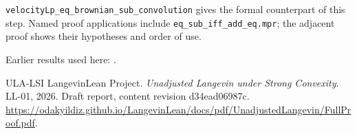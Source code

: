 \documentclass[11pt,a4paper]{article}
\begin{document}
\begin{leanbox}
\texttt{velocity\allowbreak{}Lp\_\allowbreak{}eq\_\allowbreak{}brownian\_\allowbreak{}sub\_\allowbreak{}convolution} gives the formal counterpart of this step. Named proof applications include \texttt{eq\_\allowbreak{}sub\_\allowbreak{}iff\_\allowbreak{}add\_\allowbreak{}eq.\allowbreak{}mpr}; the adjacent proof shows their hypotheses and order of use.
\end{leanbox}


Earlier results used here: \cite[Section~3.8.9]{LangevinLean2026ULASC}.

\begin{thebibliography}{ULA-LSI}
LangevinLean Project. \emph{Unadjusted Langevin under Strong Convexity}. LL-01, 2026. Draft report, content revision d34ead06987c. \url{https://odakyildiz.github.io/LangevinLean/docs/pdf/UnadjustedLangevin/FullProof.pdf}.
\end{thebibliography}
\end{document}
